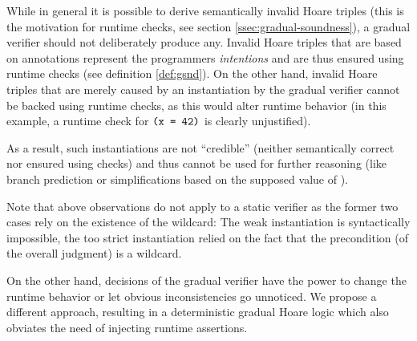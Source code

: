 \begin{description}
    While in general it is possible to derive semantically invalid Hoare triples (this is the motivation for runtime checks, see section \ref{ssec:gradual-soundness}), a gradual verifier should not deliberately produce any.
    Invalid Hoare triples that are based on annotations represent the programmers \emph{intentions} and are thus ensured using runtime checks (see definition \ref{def:gsnd}).
    On the other hand, invalid Hoare triples that are merely caused by an instantiation by the gradual verifier cannot be backed using runtime checks, as this would alter runtime behavior (in this example, a runtime check for $\textup{\texttt{(x = 42)}}$ is clearly unjustified).
    
    As a result, such instantiations are not “credible” (neither semantically correct nor ensured using checks) and thus cannot be used for further reasoning (like branch prediction or simplifications based on the supposed value of ).
    
    \begin{comment}
    Programmers may provide annotations corresponding to invalid Hoare triples, since they may be unsure how or unable to express a valid one.
    
    however this is motivated by the possibility that programmers may have context information that render the triple valid after all.
    For instance, the code in question may only be executed under circumstances that indeed cause the postcondition to be satisfied.
    
    On the other hand  invalid Hoare triples:
    The instantiation involved (here: $\phiAnd{\phiEq{x}{3}}{\phiEq{y}{2}}$) may not be used for further analysis like branch prediction, since it does not represent semantical knowledge ($\phiEq{x}{3}$ may be a false assumption).
    \end{comment}
\end{description}

Note that above observations do not apply to a static verifier as the former two cases rely on the existence of the wildcard:
The weak instantiation is syntactically impossible, the too strict instantiation relied on the fact that the precondition (of the overall judgment) is a wildcard.

On the other hand, decisions of the gradual verifier have the power to change the runtime behavior or let obvious inconsistencies go unnoticed.
We propose a different approach, resulting in a deterministic gradual Hoare logic which also obviates the need of injecting runtime assertions.



